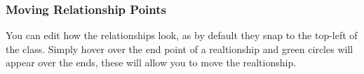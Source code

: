 \documentclass[a4paper]{article}
\begin{document}
{\subsubsection{Moving Relationship Points}
You can edit how the relationships look, as by default they snap to the top-left of the class. Simply hover over the end point of a realtionship and green circles will appear over the ends, these will allow you to move the realtionship.
\vspace{-5pt}
\begin{figure}[H]
\begin{center}
 \imagespace
{}

\end{center}
\end{figure}}
\end{document}
